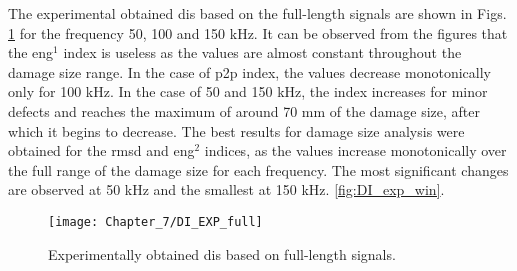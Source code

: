 The experimental obtained \acp{di} based on the full-length signals are shown in Figs. \ref{fig:DI_exp_full} for the frequency 50, 100 and 150 kHz. 
It can be observed from the figures that the \ac{eng}\(^1\) index is useless as the values are almost constant throughout the damage size range.
In the case of \ac{p2p} index, the values decrease monotonically only for 100 kHz.
In the case of 50 and 150 kHz, the index increases for minor defects and reaches the maximum of around 70 mm of the damage size, after which it begins to decrease.
The best results for damage size analysis were obtained for the \ac{rmsd} and \ac{eng}\(^2\) indices, as the values increase monotonically over the full range of the damage size for each frequency.
The most significant changes are observed at 50 kHz and the smallest at 150 kHz.
 \ref{fig:DI_exp_win}.
\begin{figure}[!tbh]
	\begin{center}
		\texttt{[image: Chapter\_7/DI\_EXP\_full]}
	\end{center}
	\caption{Experimentally obtained \acp{di} based on full-length signals.}
	\label{fig:DI_exp_full}
\end{figure}

